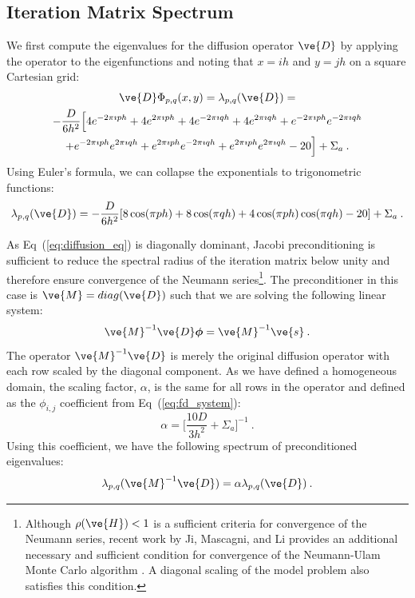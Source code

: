 \documentclass[preprint,11pt]{elsarticle}
\begin{document}
\subsection{Iteration Matrix Spectrum}
\label{subsec:iteration_spectrum}

We first compute the eigenvalues for the diffusion operator $\ve{D}$ by
applying the operator to the eigenfunctions and noting that $x=ih$ and $y=jh$
on a square Cartesian grid:
\begin{multline}
  \ve{D}\Phi_{p,q}(x,y) = \lambda_{p,q}(\ve{D})
  =\\ -\frac{D}{6h^2}\Big[4 e^{-2 \pi \imath p h} + 4 e^{2 \pi \imath
      p h} + 4 e^{-2 \pi \imath q h} + 4 e^{2 \pi \imath q h} + e^{-2
      \pi \imath p h} e^{-2 \pi \imath q h} \\ + e^{-2 \pi \imath p h}
    e^{2 \pi \imath q h} + e^{2 \pi \imath p h} e^{-2 \pi \imath q h}
    + e^{2 \pi \imath p h} e^{2 \pi \imath q h} - 20\Big] + \Sigma_a
  \:.
  \label{eq:deriv_diff_1}
\end{multline}
Using Euler's formula, we can collapse the exponentials to
trigonometric functions:
\begin{equation}
  \lambda_{p,q}(\ve{D}) = -\frac{D}{6h^2}[ 8 \cos(\pi p h) + 8
    \cos(\pi q h) + 4 \cos(\pi p h) \cos(\pi q h) - 20] + \Sigma_a\:.
  \label{eq:deriv_diff_2}
\end{equation}

As Eq~(\ref{eq:diffusion_eq}) is diagonally dominant, Jacobi preconditioning
is sufficient to reduce the spectral radius of the iteration matrix below
unity and therefore ensure convergence of the Neumann series\footnote{Although
  $\rho(\ve{H}) < 1$ is a sufficient criteria for convergence of the Neumann
  series, recent work by Ji, Mascagni, and Li provides an additional necessary
  and sufficient condition for convergence of the Neumann-Ulam Monte Carlo
  algorithm \cite{ji_2013}. A diagonal scaling of the model problem also
  satisfies this condition.}. The preconditioner in this case is $\ve{M}
= diag(\ve{D})$ such that we are solving the following linear system:
\begin{equation}
  \ve{M}^{-1} \ve{D} \boldsymbol{\phi} = \ve{M}^{-1} \ve{s}\:.
  \label{eq:precond_diffsion}
\end{equation}
The operator $\ve{M}^{-1} \ve{D}$ is merely the original diffusion operator
with each row scaled by the diagonal component. As we have defined a
homogeneous domain, the scaling factor, $\alpha$, is the same for all rows in
the operator and defined as the $\phi_{i,j}$ coefficient from
Eq~(\ref{eq:fd_system}):
\begin{equation}
  \alpha = \Bigg[\frac{10 D}{3 h^2} + \Sigma_a\Bigg]^{-1}\:.
  \label{eq:jacobi_scaling}
\end{equation}
Using this coefficient, we have the following spectrum of preconditioned
eigenvalues:
\begin{equation}
  \lambda_{p,q}(\ve{M}^{-1} \ve{D}) = \alpha \lambda_{p,q}(\ve{D})\:.
  \label{eq:preconditioned_eigenvalues}
\end{equation}
\end{document}
